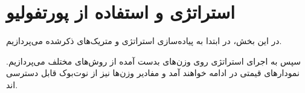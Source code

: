 \documentclass[12pt]{article}
\begin{document}
\section{استراتژی و استفاده از پورتفولیو}
در این بخش، در ابتدا به پیاده‌سازی استراتژی و متریک‌های ذکرشده می‌پردازیم.
\begin{figure}[H]
	\centering
	\quad \quad
\end{figure}
سپس به اجرای استراتژی روی وزن‌های بدست آمده از روش‌های مختلف می‌پردازیم. نمودارهای قیمتی در ادامه خواهند آمد و مفادیر وزن‌ها نیز از نوت‌بوک قابل دسترسی اند.
\end{document}
